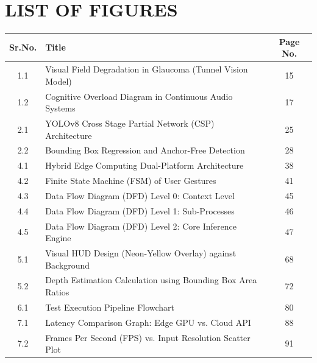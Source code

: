 \documentclass[12pt, a4paper]{report}
\begin{document}
\newpage
\chapter*{LIST OF FIGURES}
\begin{table}[H]
\centering
\renewcommand{\arraystretch}{1.5}
\begin{tabular}{|c|l|c|}
\hline
\textbf{Sr.No.} & \textbf{Title} & \textbf{Page No.} \\
\hline
1.1 & Visual Field Degradation in Glaucoma (Tunnel Vision Model) & 15 \\
1.2 & Cognitive Overload Diagram in Continuous Audio Systems & 17 \\
2.1 & YOLOv8 Cross Stage Partial Network (CSP) Architecture & 25 \\
2.2 & Bounding Box Regression and Anchor-Free Detection & 28 \\
4.1 & Hybrid Edge Computing Dual-Platform Architecture & 38 \\
4.2 & Finite State Machine (FSM) of User Gestures & 41 \\
4.3 & Data Flow Diagram (DFD) Level 0: Context Level & 45 \\
4.4 & Data Flow Diagram (DFD) Level 1: Sub-Processes & 46 \\
4.5 & Data Flow Diagram (DFD) Level 2: Core Inference Engine & 47 \\
5.1 & Visual HUD Design (Neon-Yellow Overlay) against Background & 68 \\
5.2 & Depth Estimation Calculation using Bounding Box Area Ratios & 72 \\
6.1 & Test Execution Pipeline Flowchart & 80 \\
7.1 & Latency Comparison Graph: Edge GPU vs. Cloud API & 88 \\
7.2 & Frames Per Second (FPS) vs. Input Resolution Scatter Plot & 91 \\
\hline
\end{tabular}
\end{table}

\newpage
\end{document}
